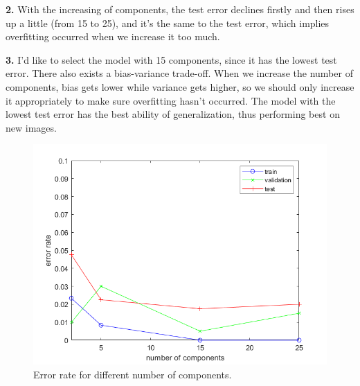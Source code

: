 \documentclass{article}
\begin{document}
\textbf{2.} With the increasing of components, the test error declines firstly and then rises up a little (from 15 to 25), and it's the same to the test error, which implies overfitting occurred when we increase it too much.\par

\textbf{3.} I'd like to select the model with 15 components, since it has the lowest test error. There also exists a bias-variance trade-off. When we increase the number of components, bias gets lower while variance gets higher, so we should only increase it appropriately to make sure overfitting hasn't occurred. The model with the lowest test error has the best ability of generalization, thus performing best on new images.

\begin{figure}[H]
	\centering
	\includegraphics[scale=0.6]{figure23}
	\caption{Error rate for different number of components.}
	\label{fig23}
\end{figure}
\end{document}
